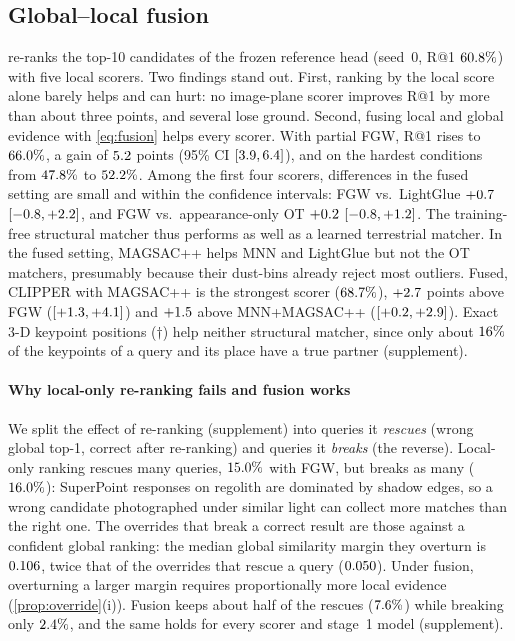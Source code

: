 \subsection{Global--local fusion}\label{sec:rerank}
 re-ranks the top-10 candidates of the frozen reference head (seed~0, R@1
$60.8\%$) with five local scorers. Two findings stand out. First, ranking by the local score
alone barely helps and can hurt: no image-plane scorer improves R@1 by more than about three points, and several
lose ground. Second, fusing local and global evidence with \cref{eq:fusion} helps every scorer. With
partial FGW, R@1 rises to $66.0\%$, a gain of $5.2$ points (95\% CI
$[3.9,6.4]$), and on the hardest conditions from $47.8\%$ to $52.2\%$. Among the first four scorers, differences in the fused setting are small and
within the confidence intervals: FGW vs.\ LightGlue $+0.7$ $[-0.8,+2.2]$, and FGW
vs.\ appearance-only OT $+0.2$ $[-0.8,+1.2]$. The training-free structural
matcher thus performs as well as a learned terrestrial matcher. In the fused setting, MAGSAC++ helps
MNN and LightGlue but not the OT matchers, presumably because their dust-bins already reject most
outliers. Fused, CLIPPER with MAGSAC++ is the strongest scorer ($68.7\%$), $+2.7$ points
above FGW ($[+1.3,+4.1]$) and $+1.5$ above MNN+MAGSAC++
($[+0.2,+2.9]$). Exact 3-D keypoint positions ($\dagger$) help neither structural matcher, since
only about $16\%$ of the keypoints of a query and its place have a true partner (supplement).

\paragraph*{Why local-only re-ranking fails and fusion works}
We split the effect of re-ranking (supplement) into queries it \emph{rescues} (wrong global top-1,
correct after re-ranking) and queries it \emph{breaks} (the reverse). Local-only ranking rescues many
queries, $15.0\%$ with FGW, but breaks as many ($16.0\%$): SuperPoint responses on
regolith are dominated by shadow edges, so a wrong candidate photographed under similar light can
collect more matches than the right one. The overrides that break a correct result are those against
a confident global ranking: the median global similarity margin they overturn is $0.106$,
twice that of the overrides that rescue a query ($0.050$). Under fusion, overturning a
larger margin requires proportionally more local evidence (\cref{prop:override}(i)). Fusion keeps about half
of the rescues ($7.6\%$) while breaking only $2.4\%$, and the same holds for every scorer
and stage~1 model (supplement).

